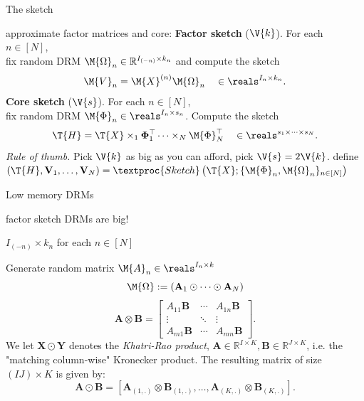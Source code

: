 \documentclass[handout,xcolor={usenames,dvipsnames}]{beamer}
\begin{document}
\begin{frame}{The sketch}

approximate factor matrices and core:
\bit
\pitem \textbf{Factor sketch} ($\V{k}$).
For each $n \in [N]$,\\
fix random DRM $\M{\Omega}_n \in \mathbb{R}^{I_{(-n)} \times k_n}$
and compute the sketch
\[
\M{V}_n = \M{X}^{(n)}\M{\Omega}_n
\quad \in \reals^{I_n \times k_n}.
\]
\pitem \textbf{Core sketch} ($\V{s}$).
For each $n \in [N]$, \\
fix random DRM $\M{\Phi}_n \in \reals^{I_n \times s_n}$.
Compute the  sketch
\[
\T{H} =\T{X} \times_1 \mathbf{\Phi}_1^\top \cdots \times_N \M{\Phi}_N^\top
\quad \in \reals^{s_1 \times \cdots \times s_N}.
\]
\pitem \emph{Rule of thumb.} Pick $\V{k}$ as big as you can afford, pick $\V{s} = 2\V{k}$.
\pitem define $\left(\T{H}, \mathbf{V}_1, \ldots, \mathbf{V}_N\right) =
\textproc{Sketch}\left(\T{X}; \{\M{\Phi}_n, \M{\Omega}_n\}_{n \in [N]}\right)$
\eit

\end{frame}

\begin{frame}{Low memory DRMs}

factor sketch DRMs are big! {}
\bit \item $I_{(-n)} \times k_n$ for each $n \in [N]$ 
\eit

\bit
\item {}  Generate random matrix $\M{A}_n \in \reals^{I_n\times k}$ 
\[
\label{eq:TRP}
\M{\Omega}:= (\mathbf{A}_1 \odot \cdots \odot \mathbf{A}_N)
\]
\[
\mathbf{A} \otimes \mathbf{B} = \left[
\begin{array}{ccc}
A_{11}\mathbf{B}   & \cdots & A_{1n}\mathbf{B} \\
\vdots & \ddots & \vdots \\
A_{m1}\mathbf{B} & \cdots &   A_{mn}\mathbf{B}
\end{array}
\right].
\]
We let $\mathbf{X} \odot \mathbf{Y}$ denotes the \textit{Khatri-Rao product}, $\mathbf{A} \in \mathbb{R}^{I \times K}, \mathbf{B} \in \mathbb{R}^{J \times K}$, i.e. the "matching column-wise" Kronecker product. The resulting matrix of size $(IJ) \times K$ is given by: 
\begin{equation}\label{khatri-rao}
\mathbf{A} \odot \mathbf{B} = [\mathbf{A}_{(1,.)} \otimes \mathbf{B}_{(1,.)}, \dots, \mathbf{A}_{(K, .)} \otimes \mathbf{B}_{(K,.)}].
\end{equation}
\eit
\end{frame}
\end{document}
